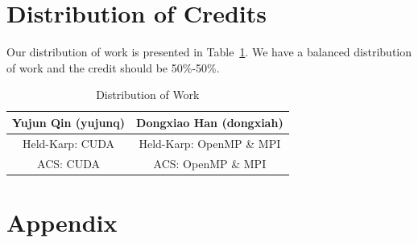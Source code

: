 \documentclass{article}
\begin{document}
\section{Distribution of Credits}
Our distribution of work is presented in Table~\ref{tab:credit}. We have a balanced distribution of work and the credit should be 50\%-50\%.
\begin{table}[!ht]
    \centering
    \begin{tabular}{c|c}
        Yujun Qin (yujunq) & Dongxiao Han (dongxiah) \\\hline
        Held-Karp: CUDA & Held-Karp: OpenMP \& MPI  \\ \hline
        ACS: CUDA & ACS: OpenMP \& MPI \\
    \end{tabular}
    \caption{Distribution of Work}
    \label{tab:credit}
\end{table}

%


\appendix

\section{Appendix}
\end{document}
